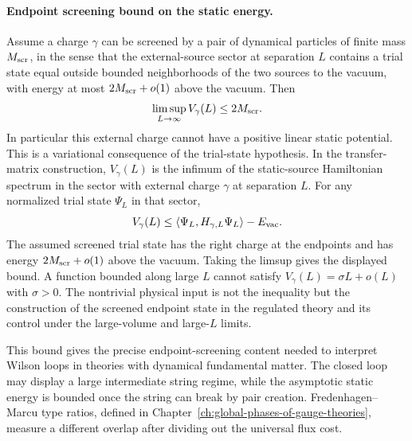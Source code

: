 \paragraph{Endpoint screening bound on the static energy.}
Assume a charge \(\gamma\) can be screened by a pair of dynamical particles of
finite mass \(M_{\rm scr}\), in the sense that the external-source sector at
separation \(L\) contains a trial state equal outside bounded neighborhoods
of the two sources to the vacuum, with energy at most \(2M_{\rm scr}+o(1)\)
above the vacuum.  Then
\[
  \limsup_{L\to\infty} V_\gamma(L)\le 2M_{\rm scr}.
\]
In particular this external charge cannot have a positive linear static
potential.
This is a variational consequence of the trial-state hypothesis.  In the
transfer-matrix construction, \(V_\gamma(L)\) is the infimum of the
static-source Hamiltonian spectrum in the sector with external charge
\(\gamma\) at separation \(L\).  For any normalized trial state \(\Psi_L\) in
that sector,
\[
  V_\gamma(L)\le
  \langle \Psi_L,H_{\gamma,L}\Psi_L\rangle-E_{\rm vac}.
\]
The assumed screened trial state has the right charge at the endpoints and
has energy \(2M_{\rm scr}+o(1)\) above the vacuum.  Taking the limsup gives
the displayed bound.  A function bounded along large \(L\) cannot satisfy
\(V_\gamma(L)=\sigma L+o(L)\) with \(\sigma>0\).
The nontrivial physical input is not the inequality but the construction of
the screened endpoint state in the regulated theory and its control under the
large-volume and large-\(L\) limits.

This bound gives the precise endpoint-screening content needed to
interpret Wilson loops in theories with dynamical fundamental matter.  The
closed loop may display a large intermediate string regime, while the
asymptotic static energy is bounded once the string can break by pair
creation.  Fredenhagen--Marcu type ratios, defined in
Chapter~\ref{ch:global-phases-of-gauge-theories}, measure a different
overlap after dividing out the universal flux cost.

